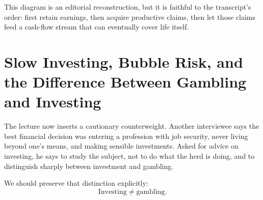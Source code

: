 \begin{figure}
\centering
{}
\end{figure}

This diagram is an editorial reconstruction, but it is faithful to the transcript's order: first retain earnings, then acquire productive claims, then let those claims feed a cash-flow stream that can eventually cover life itself.

\section{Slow Investing, Bubble Risk, and the Difference Between Gambling and Investing}

The lecture now inserts a cautionary counterweight. Another interviewee says the best financial decision was entering a profession with job security, never living beyond one's means, and making sensible investments. Asked for advice on investing, he says to study the subject, not to do what the herd is doing, and to distinguish sharply between investment and gambling.

We should preserve that distinction explicitly:
\begin{equation}
\text{Investing} \neq \text{gambling}.
\end{equation}

